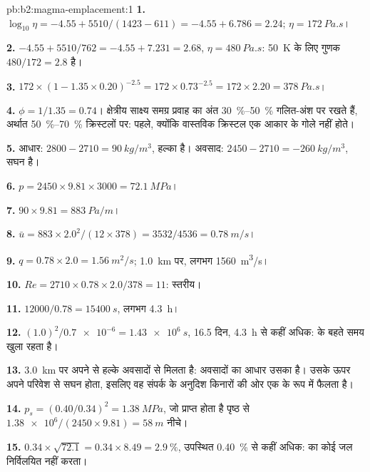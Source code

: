\begin{solution}{pb:b2:magma-emplacement:1}
\textbf{1.} $\log_{10}\eta = -4.55 + 5510/(1423 - 611) = -4.55 + 6.786 = 2.24$;
$\eta = \qty{172}{Pa.s}$।

\textbf{2.} $-4.55 + 5510/762 = -4.55 + 7.231 = 2.68$, $\eta = \qty{480}{Pa.s}$: \qty{50}{K} के लिए
गुणक $480/172 = 2.8$ है।

\textbf{3.} $172\times(1 - 1.35\times0.20)^{-2.5} = 172\times0.73^{-2.5} = 172\times2.20 =
\qty{378}{Pa.s}$।

\textbf{4.} $\phi = 1/1.35 = 0.74$। क्षेत्रीय साक्ष्य समग्र प्रवाह का अंत
\qtyrange{30}{50}{\percent} गलित-अंश पर रखते हैं, अर्थात
\qtyrange{50}{70}{\percent} क्रिस्टलों पर: पहले, क्योंकि वास्तविक क्रिस्टल एक आकार के
गोले नहीं होते।

\textbf{5.} आधार: $2800 - 2710 = \qty{90}{kg/m^3}$,  हल्का है।
अवसाद: $2450 - 2710 = \qty{-260}{kg/m^3}$,  सघन है।

\textbf{6.} $p = 2450\times9.81\times3000 = \qty{72.1}{MPa}$।

\textbf{7.} $90\times9.81 = \qty{883}{Pa/m}$।

\textbf{8.} $\bar u = 883\times2.0^2/(12\times378) = 3532/4536 = \qty{0.78}{m/s}$।

\textbf{9.} $q = 0.78\times2.0 = \qty{1.56}{m^2/s}$; \qty{1.0}{km} पर, लगभग
\qty{1560}{m^3/s}।

\textbf{10.} $Re = 2710\times0.78\times2.0/378 = 11$: स्तरीय।

\textbf{11.} $12000/0.78 = \qty{15400}{s}$, लगभग \qty{4.3}{h}।

\textbf{12.} $(1.0)^2/\num{0.7e-6} = \qty{1.43e6}{s}$, 16.5 दिन, \qty{4.3}{h} से
कहीं अधिक:  के बहते समय  खुला रहता है।

\textbf{13.} \qty{3.0}{km} पर  अपने से हल्के अवसादों से मिलता है: अवसादों का
आधार उसका  है। उसके ऊपर  अपने परिवेश से सघन
होता, इसलिए वह संपर्क के अनुदिश किनारों की ओर एक  के रूप में
फैलता है।

\textbf{14.} $p_s = (0.40/0.34)^2 = \qty{1.38}{MPa}$, जो प्राप्त होता है
पृष्ठ से $\num{1.38e6}/(2450\times9.81) = \qty{58}{m}$ नीचे।

\textbf{15.} $0.34\times\sqrt{72.1} = 0.34\times8.49 = \qty{2.9}{\percent}$, उपस्थित
\qty{0.40}{\percent} से कहीं अधिक:  का  कोई जल निर्विलयित नहीं करता।


\end{solution}
